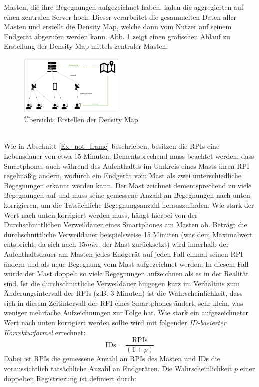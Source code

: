 \documentclass[conference,compsoc]{IEEEtran}
\begin{document}
Masten, die ihre Begegnungen aufgezeichnet haben, laden die aggregierten auf einen zentralen Server hoch. 
Dieser verarbeitet die gesammelten Daten aller Masten und erstellt die Density Map, welche dann vom Nutzer auf seinem Endgerät abgerufen werden kann.
Abb. \ref{density_creation} zeigt einen grafischen Ablauf zu Erstellung der Density Map mittels zentraler Masten. \\
\begin{figure}[h]
	\centering
	\includegraphics[width=0.45\textwidth]{"Density_Map_Overview"}
	\caption{Übersicht: Erstellen der Density Map}
	\label{density_creation}
\end{figure} 
\\
Wie in Abschnitt \ref{Ex_not_frame} beschrieben, besitzen die RPIs eine Lebensdauer von etwa 15 Minuten. 
Dementsprechend muss beachtet werden, dass Smartphones auch  während des Aufenthaltes im Umkreis eines Masts ihren RPI regelmäßig ändern, wodurch ein Endgerät vom Mast als zwei unterschiedliche Begegnungen erkannt werden kann. 
Der Mast zeichnet dementsprechend zu viele Begegnungen auf und muss seine gemessene Anzahl an Begegnungen nach unten korrigieren, um die Tatsächliche Begegnungsanzahl herauszufinden. 
Wie stark der Wert nach unten korrigiert werden muss, hängt hierbei von der Durchschnittlichen Verweildauer eines Smartphones am Masten ab. 
Beträgt die durchschnittliche Verweildauer beispielsweise 15 Minuten (was dem Maximalwert entspricht, da sich nach $15 min.$ der Mast zurücksetzt) wird innerhalb der Aufenthaltsdauer am Masten jedes Endgerät auf jeden Fall einmal seinen RPI ändern und als neue Begegnung vom Mast aufgezeichnet werden. 
In diesem Fall würde der Mast doppelt so viele Begegnungen aufzeichnen als es in der Realität sind.
Ist die durchschnittliche Verweildauer hingegen kurz im Verhältnis zum Änderungsintervall der RPIs (z.B. 3 Minuten) ist die Wahrscheinlichkeit,  dass sich in diesem Zeitintervall der RPI eines Smartphones ändert, sehr klein, was weniger mehrfache Aufzeichnungen zur Folge hat. 
Wie stark ein aufgezeichneter Wert nach unten korrigiert werden sollte wird mit folgender \textit{ID-basierter Korrekturformel} errechnet: 
\begin{equation}
	\text{IDs} = \frac{\text{RPIs}}{(1+p)}
\end{equation}
Dabei ist \glqq RPIs\grqq{} die gemessene Anzahl an RPIs des Masten und \glqq IDs\grqq{}  die voraussichtlich tatsächliche Anzahl an Endgeräten.
Die Wahrscheinlichkeit $p$ einer doppelten Registrierung ist definiert durch:
\end{document}
